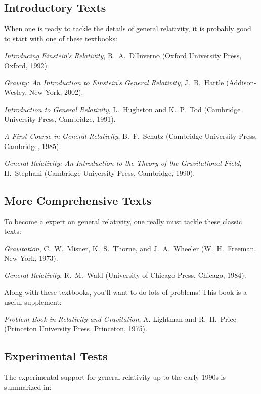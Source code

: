 \subsection*{Introductory Texts}

When one is ready to tackle the details of general relativity,
it is probably good to start with one of these textbooks:

\medskip
\noindent
{\it Introducing Einstein's Relativity}, 
R.\ A.\ D'Inverno
(Oxford University Press, Oxford, 1992).

\medskip
\noindent
{\it Gravity: An Introduction to Einstein's General Relativity},
J.\ B.\ Hartle (Addison-Wesley, New York, 2002).

\medskip
\noindent
{\it Introduction to General Relativity},
L.\ Hughston and K.\ P.\ Tod
(Cambridge University Press, Cambridge, 1991).

\medskip
\noindent
{\it A First Course in General Relativity},
B.\ F.\ Schutz
(Cambridge University Press, Cambridge, 1985).

\medskip
\noindent
{\it General Relativity: An Introduction to the 
Theory of the Gravitational Field},
H.\ Stephani
(Cambridge University Press, Cambridge, 1990).

\subsection*{More Comprehensive Texts}

To become a expert on general relativity, one really must tackle
these classic texts:

\medskip
\noindent 
{\it Gravitation}, 
C.\ W.\ Misner, K.\ S.\ Thorne, and J.\ A.\ Wheeler
(W.\ H.\ Freeman, New York, 1973).

\medskip
\noindent 
{\it General Relativity},
R.\ M.\ Wald
(University of Chicago Press, Chicago, 1984).

\medskip
\noindent
Along with these textbooks, you'll want to do lots of problems!
This book is a useful supplement:

\medskip
\noindent 
{\it Problem Book in Relativity and Gravitation}, A. Lightman and R.\ H.\ 
Price (Princeton University Press, Princeton, 1975).

\subsection*{Experimental Tests}

The experimental support for general relativity up to the early
1990s is summarized in:

